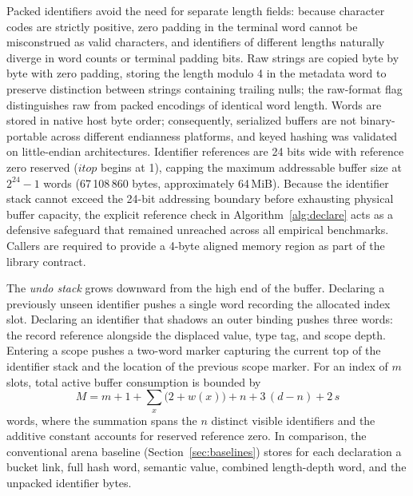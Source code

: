 Packed identifiers avoid the need for separate length fields: because character codes are strictly positive, zero padding in the terminal word cannot be misconstrued as valid characters, and identifiers of different lengths naturally diverge in word counts or terminal padding bits. Raw strings are copied byte by byte with zero padding, storing the length modulo 4 in the metadata word to preserve distinction between strings containing trailing nulls; the raw-format flag distinguishes raw from packed encodings of identical word length. Words are stored in native host byte order; consequently, serialized buffers are not binary-portable across different endianness platforms, and keyed hashing was validated on little-endian architectures. Identifier references are 24 bits wide with reference zero reserved ($\mathit{itop}$ begins at 1), capping the maximum addressable buffer size at $2^{24}-1$ words (67\,108\,860 bytes, approximately 64\,MiB). Because the identifier stack cannot exceed the 24-bit addressing boundary before exhausting physical buffer capacity, the explicit reference check in Algorithm~\ref{alg:declare} acts as a defensive safeguard that remained unreached across all empirical benchmarks. Callers are required to provide a 4-byte aligned memory region as part of the library contract.

The \emph{undo stack} grows downward from the high end of the buffer. Declaring a previously unseen identifier pushes a single word recording the allocated index slot. Declaring an identifier that shadows an outer binding pushes three words: the record reference alongside the displaced value, type tag, and scope depth. Entering a scope pushes a two-word marker capturing the current top of the identifier stack and the location of the previous scope marker. For an index of $m$ slots, total active buffer consumption is bounded by
\begin{equation}
M = m + 1 + \sum_{x} \bigl(2 + w(x)\bigr) + n + 3\,(d - n) + 2\,s
\label{eq:memory}
\end{equation}
words, where the summation spans the $n$ distinct visible identifiers and the additive constant accounts for reserved reference zero. In comparison, the conventional arena baseline (Section~\ref{sec:baselines}) stores for each declaration a bucket link, full hash word, semantic value, combined length-depth word, and the unpacked identifier bytes.

